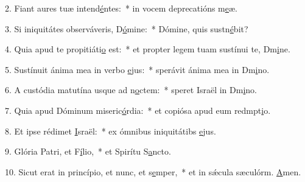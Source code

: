 2. Fiant aures tuæ intend\uline{é}ntes:~* in vocem deprecatións m\uline{e}æ.\par 
3. Si iniquitátes observáveris, D\uline{ó}mine:~* Dómine, quis sustn\uline{é}bit?\par 
4. Quia apud te propitiáti\uline{o} est:~* et propter legem tuam sustínui te, Dm\uline{i}ne.\par 
5. Sustínuit ánima mea in verbo \uline{e}jus:~* sperávit ánima mea in Dm\uline{i}no.\par 
6. A custódia matutína usque ad n\uline{o}ctem:~* speret Israël in Dm\uline{i}no.\par 
7. Quia apud Dóminum miseric\uline{ó}rdia:~* et copiósa apud eum redmpt\uline{i}o.\par 
8. Et ipse rédimet \uline{I}sraël:~* ex ómnibus iniquitátibs \uline{e}jus.\par 
9. Glória Patri, et F\uline{í}lio,~* et Spirítu S\uline{a}ncto.\par 
10. Sicut erat in princípio, et nunc, et s\uline{e}mper,~* et in sǽcula sæculórm. \uline{A}men.\par 
